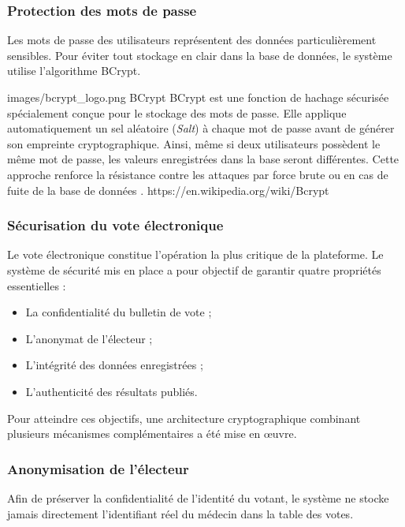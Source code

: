 ﻿\documentclass[12pt,a4paper]{report}
\begin{document}
\subsubsection{Protection des mots de passe}

Les mots de passe des utilisateurs représentent des données particulièrement
sensibles. Pour éviter tout stockage en clair dans la base de données, le
système utilise l’algorithme BCrypt.

\techno
{images/bcrypt_logo.png}
{BCrypt}
{BCrypt est une fonction de hachage sécurisée spécialement conçue pour le
stockage des mots de passe. Elle applique automatiquement un sel aléatoire
(\textit{Salt}) à chaque mot de passe avant de générer son empreinte
cryptographique. Ainsi, même si deux utilisateurs possèdent le même mot de
passe, les valeurs enregistrées dans la base seront différentes. Cette approche
renforce la résistance contre les attaques par force brute ou en cas de fuite
de la base de données \cite{bcryptPaper}.}
{https://en.wikipedia.org/wiki/Bcrypt}

\subsubsection{Sécurisation du vote électronique}

Le vote électronique constitue l’opération la plus critique de la plateforme.
Le système de sécurité mis en place a pour objectif de garantir quatre
propriétés essentielles :

\begin{itemize}
\item La confidentialité du bulletin de vote ;
\item L’anonymat de l’électeur ;
\item L’intégrité des données enregistrées ;
\item L’authenticité des résultats publiés.
\end{itemize}

Pour atteindre ces objectifs, une architecture cryptographique combinant
plusieurs mécanismes complémentaires a été mise en œuvre.

\subsubsection{Anonymisation de l’électeur}

Afin de préserver la confidentialité de l’identité du votant, le système ne
stocke jamais directement l’identifiant réel du médecin dans la table des votes.
\end{document}
